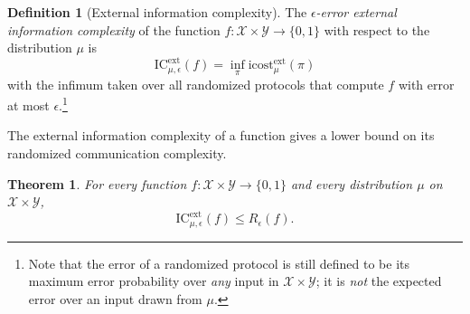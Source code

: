 \documentclass[11pt]{amsart}
\theoremstyle{plain}
\newtheorem{theorem}{Theorem}
\theoremstyle{definition}
\newtheorem{definition}{Definition}
\theoremstyle{plain}
\newcommand{\calX}{\mathcal{X}}
\newcommand{\calY}{\mathcal{Y}}
\newcommand{\ICext}{\mathrm{IC}^{\mathrm{ext}}}
\newcommand{\icostext}{\mathrm{icost}^{\mathrm{ext}}}
\begin{document}
\begin{definition}[External information complexity]
The \emph{$\epsilon$-error external information complexity} of the function $f : \calX \times \calY \to \{0,1\}$ with respect to the distribution $\mu$ is
\[
\ICext_{\mu,\epsilon}(f) = \inf_{\pi} \icostext_\mu(\pi)
\]
with the infimum taken over all randomized protocols that compute $f$ with error at most $\epsilon$.\footnote{Note that the error of a randomized protocol is still defined to be its maximum error probability over \emph{any} input in $\calX \times \calY$; it is \emph{not} the expected error over an input drawn from $\mu$.}
\end{definition}

The external information complexity of a function gives a lower bound on its randomized communication complexity.

\begin{theorem}\label{th:2}
For every function $f : \calX \times \calY \to \{0,1\}$ and every distribution $\mu$ on $\calX \times \calY$,
\[
\ICext_{\mu,\epsilon}(f) \le R_\epsilon(f).
\]
\end{theorem}
\end{document}
